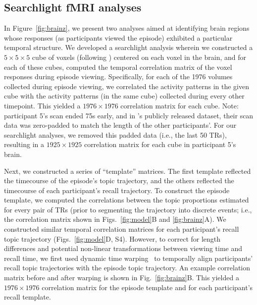 \documentclass[10pt]{article}
\newcommand{\corrmats}{S4}
\begin{document}
\subsection*{Searchlight fMRI analyses}
In Figure~\ref{fig:brainz}, we present two analyses aimed at identifying brain regions whose responses (as participants viewed the episode) exhibited a particular temporal structure.  We developed a searchlight analysis wherein we constructed a $5 \times 5 \times 5$ cube of voxels (following \citealp{ChenEtal17}) centered on each voxel in the brain, and for each of these cubes, computed the temporal correlation matrix of the voxel responses during episode viewing.  Specifically, for each of the 1976 volumes collected during episode viewing, we correlated the activity patterns in the given cube with the activity patterns (in the same cube) collected during every other timepoint.  This yielded a $1976 \times 1976$ correlation matrix for each cube.  Note: participant 5's scan ended 75s early, and in \citealp{ChenEtal17}'s publicly released dataset, their scan data was zero-padded to match the length of the other participants'.  For our searchlight analyses, we removed this padded data (i.e., the last 50 TRs), resulting in a $1925 \times 1925$ correlation matrix for each cube in participant 5's brain.

Next, we constructed a series of ``template'' matrices.  The first template reflected the timecourse of the episode's topic trajectory, and the others reflected the timecourse of each participant's recall trajectory.  To construct the episode template, we computed the correlations between the topic proportions estimated for every pair of TRs (prior to segmenting the trajectory into discrete events; i.e., the correlation matrix shown in Figs.~\ref{fig:model}B and \ref{fig:brainz}A).  We constructed similar temporal correlation matrices for each participant's recall topic trajectory (Figs.~\ref{fig:model}D, \corrmats).  However, to correct for length differences and potential non-linear transformations between viewing time and recall time, we first used dynamic time warping~\citep{BernClif94} to temporally align participants' recall topic trajectories with the episode topic trajectory.  An example correlation matrix before and after warping is shown in Fig.~\ref{fig:brainz}B.  This yielded a $1976 \times 1976$ correlation matrix for the episode template and for each participant's recall template.
\end{document}
